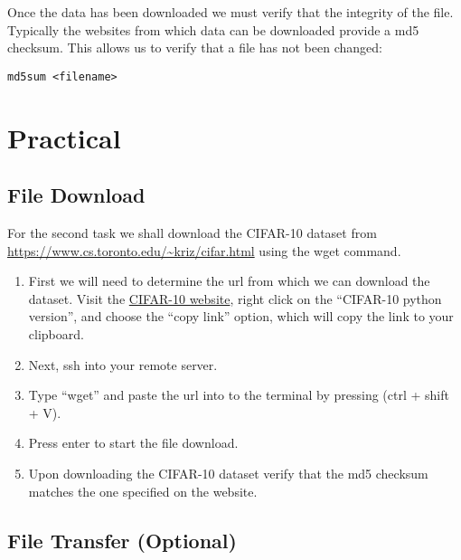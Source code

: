 \documentclass[
]{book}
\providecommand{\tightlist}{%
  \setlength{\itemsep}{0pt}\setlength{\parskip}{0pt}}
\begin{document}
Once the data has been downloaded we must verify that the integrity of the file.
Typically the websites from which data can be downloaded provide a md5 checksum.
This allows us to verify that a file has not been changed:

\begin{verbatim}
md5sum <filename>
\end{verbatim}

\hypertarget{practical-1}{%
\section{Practical}\label{practical-1}}

\hypertarget{file-download-1}{%
\subsection{File Download}\label{file-download-1}}

For the second task we shall download the CIFAR-10 dataset from
\url{https://www.cs.toronto.edu/~kriz/cifar.html}
using the wget command.

\begin{enumerate}
\def\labelenumi{\arabic{enumi})}
\tightlist
\item
  First we will need to determine the url from which we can download the dataset.
  Visit the \href{https://www.cs.toronto.edu/~kriz/cifar.html}{CIFAR-10 website}, right
  click on the ``CIFAR-10 python version'', and choose the ``copy link'' option,
  which will copy the link to your clipboard.
\item
  Next, ssh into your remote server.
\item
  Type ``wget'' and paste the url into to the terminal by pressing (ctrl + shift + V).
\item
  Press enter to start the file download.
\item
  Upon downloading the CIFAR-10 dataset verify that the md5 checksum matches the one specified on the website.
\end{enumerate}

\hypertarget{file-transfer-optional}{%
\subsection{File Transfer (Optional)}\label{file-transfer-optional}}
\end{document}
